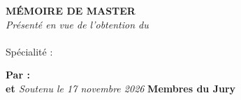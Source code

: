 \noindent{\color{\CoverRuleColor}\rule{\linewidth}{1.1pt}}
\vskip0.45cm
\begin{center}
{\color{\CoverTitleColor}\sffamily\bfseries\fontsize{13.5}{16}\selectfont MÉMOIRE DE MASTER}\\[0.45cm]
{\large\textit{Présenté en vue de l'obtention du}}\\[0.28cm]
{\large\bfseries\@diplomaName}\\[0.28cm]
{\large Spécialité : \@speciality}
\end{center}
\vskip0.45cm
\noindent{\color{\CoverRuleColor}\rule{\linewidth}{1.1pt}}
\vskip0.12cm
\begin{center}
{\color{\CoverTitleColor}\bfseries\large\@title}
\end{center}
\vskip0.12cm
\noindent{\color{\CoverRuleColor}\rule{\linewidth}{1.1pt}}
\vskip0.95cm
\begin{center}
\large
\textbf{Par :}\\[4mm]
{
    {\bfseries\large\@author \quad et \quad \bfseries\large\@secondAuthor}
    {\Large\bfseries\@author}%
}
\vskip8mm
{\large\textit{Soutenu le 17 novembre 2026}}
\vskip1.05cm
{\color{\CoverTitleColor}\large\bfseries Membres du Jury}
\vskip0.75cm
\noindent
{}%
%
%
\\[3.2mm]
\noindent
{}%
%
%
\\[3.2mm]
\noindent
{}%
\makebox[\linewidth][c]{\@academicFramerName}%
\makebox[0pt][r]{\@academicFramerSpeciality}%
\end{center}
